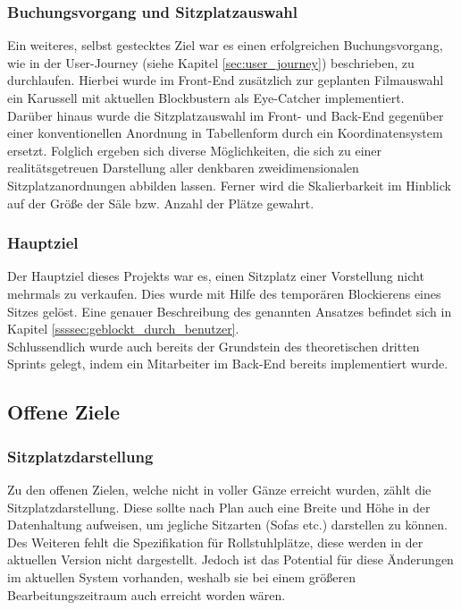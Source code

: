 \subsubsection*{Buchungsvorgang und Sitzplatzauswahl}
Ein weiteres, selbst gestecktes Ziel war es einen erfolgreichen Buchungsvorgang, wie in der User-Journey (siehe Kapitel \vref{sec:user_journey}) beschrieben, zu durchlaufen.
Hierbei wurde im Front-End zusätzlich zur geplanten Filmauswahl ein Karussell mit aktuellen Blockbustern als Eye-Catcher implementiert. \\
Darüber hinaus wurde die Sitzplatzauswahl im Front- und Back-End gegenüber einer konventionellen Anordnung in Tabellenform durch ein Koordinatensystem ersetzt.
Folglich ergeben sich diverse Möglichkeiten, die sich zu einer realitätsgetreuen Darstellung aller denkbaren zweidimensionalen Sitzplatzanordnungen abbilden lassen. 
Ferner wird die Skalierbarkeit im Hinblick auf der Größe der Säle bzw. Anzahl der Plätze gewahrt. 

\subsubsection*{Hauptziel}
Der Hauptziel dieses Projekts war es, einen Sitzplatz einer Vorstellung nicht mehrmals zu verkaufen.
Dies wurde mit Hilfe des temporären Blockierens eines Sitzes gelöst.  
Eine genauer Beschreibung des genannten Ansatzes befindet sich in Kapitel \vref{ssssec:geblockt_durch_benutzer}. \\

Schlussendlich wurde auch bereits der Grundstein des theoretischen dritten Sprints gelegt, indem ein Mitarbeiter im Back-End bereits implementiert wurde.

\subsection{Offene Ziele}
\label{ssec:offene_ziele}
\subsubsection*{Sitzplatzdarstellung}
Zu den offenen Zielen, welche nicht in voller Gänze erreicht wurden, zählt die Sitzplatzdarstellung.
Diese sollte nach Plan auch eine Breite und Höhe in der Datenhaltung aufweisen, um jegliche Sitzarten (Sofas etc.) darstellen zu können.
Des Weiteren fehlt die Spezifikation für Rollstuhlplätze, diese werden in der aktuellen Version nicht dargestellt.
Jedoch ist das Potential für diese Änderungen im aktuellen System vorhanden, weshalb sie bei einem größeren Bearbeitungszeitraum auch erreicht worden wären.

